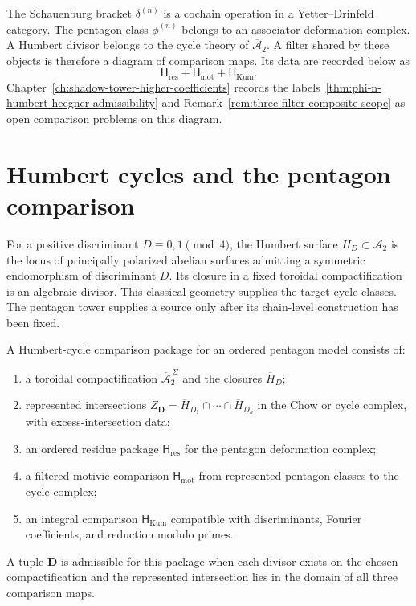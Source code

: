 \begin{remark}
\label{rem:YD-delta-filter-scope}
%
The Schauenburg bracket \(\delta^{(n)}\) is a cochain operation in a
Yetter--Drinfeld category.  The pentagon class \(\phi^{(n)}\) belongs
to an associator deformation complex.  A Humbert divisor belongs to
the cycle theory of \(\overline{\mathcal A}_2\).  A filter shared by
these objects is therefore a diagram of comparison maps.  Its data are
recorded below as
\[
 \mathsf H_{\mathrm{res}}+\mathsf H_{\mathrm{mot}}
 +\mathsf H_{\mathrm{Kum}}.
\]
Chapter~\ref{ch:shadow-tower-higher-coefficients} records the
labels~\ref{thm:phi-n-humbert-heegner-admissibility} and
Remark~\ref{rem:three-filter-composite-scope} as open comparison problems on
this diagram.
\end{remark}

\section{Humbert cycles and the pentagon comparison}
\label{sec:humbert-heegner-admissibility-filter}

For a positive discriminant \(D\equiv0,1\pmod4\), the Humbert surface
\(H_D\subset\mathcal A_2\) is the locus of principally polarized
abelian surfaces admitting a symmetric endomorphism of discriminant
\(D\).  Its closure in a fixed toroidal compactification is an
algebraic divisor.  This classical geometry supplies the target cycle
classes.  The pentagon tower supplies a source only after its
chain-level construction has been fixed.

\begin{definition}
\label{def:humbert-heegner-admissible-cycle}
%
\ClaimStatusDefinitional
A Humbert-cycle comparison package for an ordered pentagon model
consists of:
\begin{enumerate}[label=\textup{(H\arabic*)}]
\item a toroidal compactification
 \(\overline{\mathcal A}_2^{\,\Sigma}\) and the closures
 \(\overline H_D\);
\item represented intersections
 \(Z_{\mathbf D}=\overline H_{D_1}\cap\cdots\cap\overline H_{D_k}\)
 in the Chow or cycle complex, with excess-intersection data;
\item an ordered residue package \(\mathsf H_{\mathrm{res}}\) for the
 pentagon deformation complex;
\item a filtered motivic comparison
 \(\mathsf H_{\mathrm{mot}}\) from represented pentagon classes to the
 cycle complex;
\item an integral comparison \(\mathsf H_{\mathrm{Kum}}\) compatible
 with discriminants, Fourier coefficients, and reduction modulo
 primes.
\end{enumerate}
A tuple \(\mathbf D\) is admissible for this package when each divisor
exists on the chosen compactification and the represented intersection
lies in the domain of all three comparison maps.
\end{definition}


